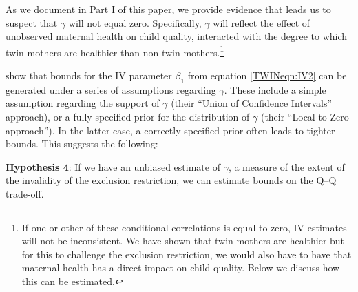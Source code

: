\documentclass[subeqn]{article}
\begin{document}
\begin{spacing}{1.4}
As we document in Part I of this paper, we provide evidence that leads us to
suspect that $\gamma$ will not equal zero. 
Specifically, $\gamma$ will reflect the effect of unobserved maternal health
on child quality, interacted with the degree to which twin mothers are healthier
than non-twin mothers.\footnote{If one or other of these conditional correlations is equal to zero,
  IV estimates will not be inconsistent. We have shown that twin mothers are healthier but for this to challenge the exclusion restriction, we would also have to have that maternal health has a direct impact on child quality. Below we discuss how this can be estimated.}


\citet{Conleyetal2012} show that bounds for the IV parameter $\beta_1$
from equation \ref{TWINeqn:IV2} can be generated under a series of assumptions
regarding $\gamma$.  These include a simple assumption regarding the support of
$\gamma$ (their ``Union of Confidence Intervals'' approach), or a fully specified
prior for the distribution of $\gamma$ (their ``Local to Zero approach'').  In the
latter case, a correctly specified prior often leads to tighter bounds. This suggests the following:

\noindent \textbf{Hypothesis 4}: If we have an unbiased estimate of $\gamma$, a measure of the extent of the invalidity of the exclusion restriction, we can estimate bounds on the Q--Q trade-off.


\end{spacing}
\end{document}
